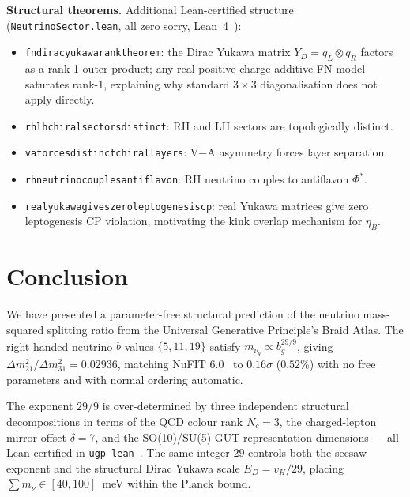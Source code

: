 \documentclass[12pt,a4paper]{article}
\theoremstyle{definition}
\theoremstyle{remark}
\newcommand{\lean}[1]{%
  \penalty-100
  \begingroup\def\_{\textunderscore\allowbreak}\texttt{#1}\endgroup}
\begin{document}
\medskip
\noindent\textbf{Structural theorems.}
Additional Lean-certified structure
(\texttt{NeutrinoSector.lean}, all zero sorry, Lean~4~\cite{ugp-lean}):
\begin{itemize}[leftmargin=1.2em,itemsep=0.05em]
  \item \lean{fn\_dirac\_yukawa\_rank\_theorem}: the Dirac Yukawa matrix $Y_D = q_L \otimes q_R$
    factors as a rank-1 outer product; any real positive-charge additive FN model
    saturates rank-1, explaining why standard $3\times3$ diagonalisation does not apply directly.
  \item \lean{rh\_lh\_chiral\_sectors\_distinct}: RH and LH sectors are topologically distinct.
  \item \lean{va\_forces\_distinct\_chiral\_layers}: V$-$A asymmetry forces layer separation.
  \item \lean{rh\_neutrino\_couples\_antiflavon}: RH neutrino couples to antiflavon $\Phi^*$.
  \item \lean{real\_yukawa\_gives\_zero\_leptogenesis\_cp}: real Yukawa matrices give
    zero leptogenesis CP violation, motivating the kink overlap mechanism for $\eta_B$.
\end{itemize}

\section{Conclusion}
\label{sec:conclusion}

We have presented a parameter-free structural prediction of the
neutrino mass-squared splitting ratio from the Universal Generative
Principle's Braid Atlas.
The right-handed neutrino $b$-values $\{5, 11, 19\}$ satisfy
$m_{\nu_g} \propto b_g^{29/9}$, giving
$\Delta m^2_{21}/\Delta m^2_{31} = 0.02936$, matching NuFIT 6.0~\cite{NuFIT60}
to $0.16\sigma$ ($0.52\%$) with no free parameters and with normal ordering automatic.

The exponent $29/9$ is over-determined by three independent
structural decompositions in terms of the QCD colour rank $N_c = 3$,
the charged-lepton mirror offset $\delta = 7$, and the SO(10)/SU(5)
GUT representation dimensions --- all Lean-certified in
\lean{ugp-lean}~\cite{SpivackUGPFormalization,ugp-lean}.
The same integer $29$ controls both the seesaw exponent and the
structural Dirac Yukawa scale $E_D = v_H/29$, placing
$\sum m_\nu \in [40, 100]$~meV within the Planck bound.
\end{document}
